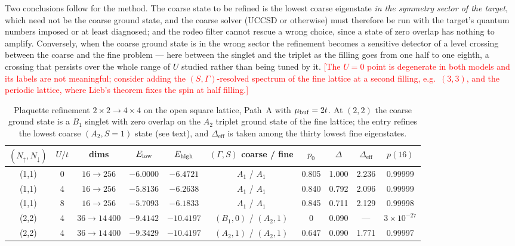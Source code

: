 \documentclass[
  aps,
  prc,
  reprint,
  superscriptaddress,
  floatfix,
  nofootinbib
]{revtex4-2}
\newcommand{\todo}[1]{\textcolor{red}{[#1]}}
\newcommand{\Deff}{\Delta_{\mathrm{eff}}}
\begin{document}
Two conclusions follow for the method.  The coarse state to be refined is
the lowest coarse eigenstate \emph{in the symmetry sector of the target},
which need not be the coarse ground state, and the coarse solver (UCCSD or
otherwise) must therefore be run with the target's quantum numbers imposed
or at least diagnosed; and the rodeo filter cannot rescue a wrong choice,
since a state of zero overlap has nothing to amplify.  Conversely, when the
coarse ground state is in the wrong sector the refinement becomes a sensitive
detector of a level crossing between the coarse and the fine problem --- here
between the singlet and the triplet as the filling goes from one half to one
eighth, a crossing that persists over the whole range of $U$ studied rather
than being tuned by it.  \todo{The $U=0$ point is degenerate in both models
and its labels are not meaningful; consider adding the $(S,\Gamma)$-resolved
spectrum of the fine lattice at a second filling, e.g.\ $(3,3)$, and the
periodic lattice, where Lieb's theorem fixes the spin at half filling.}

\begin{table}[t]
  \caption{Plaquette refinement $2\times2\to4\times4$ on the open square
  lattice, Path~A with $\mu_{\rm buf}=2t$.  At $(2,2)$ the coarse ground
  state is a $B_1$ singlet with zero overlap on the $A_2$ triplet ground
  state of the fine lattice; the entry refines the lowest coarse $(A_2,S=1)$
  state (see text), and $\Deff$ is taken among the thirty lowest fine
  eigenstates.}
  \label{tab:2d}
  \begin{ruledtabular}
  \begin{tabular}{cccccccccc}
  $(N_\uparrow,N_\downarrow)$ & $U/t$ & dims & $E_{\rm low}$ & $E_{\rm high}$ & $(\Gamma,S)$ coarse / fine & $p_0$ & $\Delta$ & $\Deff$ & $p(16)$\\
  \hline
  (1,1) & 0 & $16\to256$ & $-6.0000$ & $-6.4721$ & $A_1$ / $A_1$ & 0.805 & 1.000 & 2.236 & 0.99999\\
  (1,1) & 4 & $16\to256$ & $-5.8136$ & $-6.2638$ & $A_1$ / $A_1$ & 0.840 & 0.792 & 2.096 & 0.99999\\
  (1,1) & 8 & $16\to256$ & $-5.7093$ & $-6.1833$ & $A_1$ / $A_1$ & 0.845 & 0.711 & 2.129 & 0.99998\\
  (2,2) & 4 & $36\to14\,400$ & $-9.4142$ & $-10.4197$ & $(B_1,0)$ / $(A_2,1)$ & 0 & 0.090 & --- & $3\times10^{-27}$\\
  (2,2) & 4 & $36\to14\,400$ & $-9.3429$ & $-10.4197$ & $(A_2,1)$ / $(A_2,1)$ & 0.647 & 0.090 & 1.771 & 0.99997\\
  \end{tabular}
  \end{ruledtabular}
\end{table}
\end{document}
